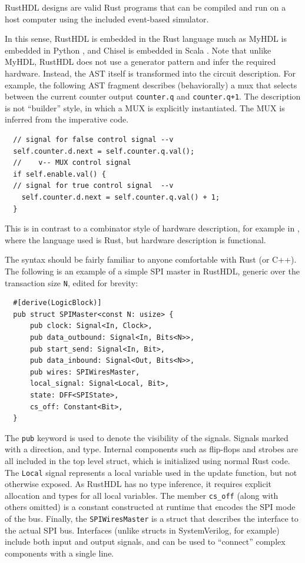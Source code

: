 \documentclass[sigplan,screen,sigconf]{acmart}
\begin{document}
\begin{tcolorbox}
RustHDL designs are valid Rust programs that can be compiled and run on a host computer
using the included event-based simulator.
\end{tcolorbox}

In this sense, RustHDL is embedded in the Rust language much as MyHDL is embedded in Python \cite{b3},
and Chisel is embedded in Scala \cite{b2}.  
Note that unlike MyHDL, RustHDL does not use a generator pattern and infer the required hardware. 
 Instead, the AST itself is transformed into the circuit description.  For example, the following 
 AST fragment describes (behaviorally) a mux that selects between the current counter output 
 \verb|counter.q| and \verb|counter.q+1|.  The description is not ``builder'' style, in which a
  MUX is explicitly instantiated.  The MUX is inferred from the imperative code. 

\begin{verbatim}
  // signal for false control signal --v
  self.counter.d.next = self.counter.q.val();
  //    v-- MUX control signal
  if self.enable.val() {
  // signal for true control signal  --v
    self.counter.d.next = self.counter.q.val() + 1;
  }
\end{verbatim}

This is in contrast to a combinator style of hardware description, for example in \cite{b4b}, where the 
language used is Rust, but hardware description is functional.

The syntax should be fairly familiar to anyone comfortable with Rust (or C++).  The 
following is an example of a simple SPI master in RustHDL, generic over the transaction size \verb|N|, edited for brevity:

\begin{verbatim}
  #[derive(LogicBlock)]
  pub struct SPIMaster<const N: usize> {
      pub clock: Signal<In, Clock>,
      pub data_outbound: Signal<In, Bits<N>>,
      pub start_send: Signal<In, Bit>,
      pub data_inbound: Signal<Out, Bits<N>>,
      pub wires: SPIWiresMaster,
      local_signal: Signal<Local, Bit>,
      state: DFF<SPIState>,
      cs_off: Constant<Bit>,
  }
\end{verbatim}  

The \verb|pub| keyword is used to denote the visibility of the signals.  Signals 
marked with a direction, and type.  Internal components such as flip-flops and strobes
are all included in the top level struct, which is initialized using normal Rust code.
The \verb|Local| signal represents a local variable used in the update function, but
not otherwise exposed.  As RustHDL has no type inference, it requires explicit allocation
and types for all local variables.  The member \verb|cs_off| (along with others omitted) 
is a constant constructed at runtime that encodes the SPI mode of the bus.  Finally, 
the \verb|SPIWiresMaster| is a struct that describes the interface to the actual SPI bus.
Interfaces (unlike structs in SystemVerilog, for example) include both input and output
signals, and can be used to ``connect'' complex components with a single line.  
\end{document}
